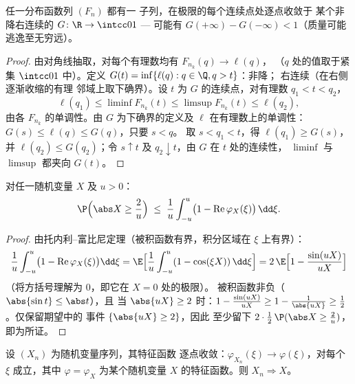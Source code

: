 \begin{theorem}[赫利选择定理]
\label{thm:b3:clt:helly}
任一分布函数列 $(F_n)$ 都有一
子列，在极限的每个连续点处逐点收敛于
某个非降右连续的 $G \colon
\R \to \intcc01$ --- 可能有 $G(+\infty) - G(-\infty) <
1$（质量可能逃逸至无穷远）。
\end{theorem}

\begin{proof}
由对角线抽取，对每个有理数均有 $F_{n_k}(q) \to \ell(q)$，
（$q$ 处的值取于紧集 $\intcc01$ 中）。定义
$G(t) = \inf\{\ell(q) : q \in \Q, q > t\}$：非降；
右连续（在右侧逐渐收缩的有理
邻域上取下确界）。设 $t$ 为
$G$ 的连续点，对有理数 $q_1 < t < q_2$，
\[
\ell(q_1) \leq \liminf F_{n_k}(t) \leq \limsup F_{n_k}(t)
\leq \ell(q_2),
\]
由各 $F_{n_k}$ 的单调性。由
$G$ 为下确界的定义及 $\ell$ 在有理数上的单调性：
$G(s) \leq \ell(q) \leq G(q)$，只要 $s < q$。
取 $s < q_1 < t$，得 $\ell(q_1) \geq G(s)$，并
$\ell(q_2) \leq G(q_2)$；令 $s \uparrow t$ 及 $q_2
\downarrow t$，由 $G$ 在 $t$ 处的连续性，
$\liminf$ 与 $\limsup$ 都夹向 $G(t)$。
\end{proof}

\begin{lemma}[由特征函数得紧性]
\label{lem:b3:clt:tightness}
对任一随机变量 $X$ 及 $u > 0$：
\[
\P\Bigl(\abs X \geq \frac2u\Bigr) \;\leq\;
\frac1u\int_{-u}^{u}\bigl(1 -
\operatorname{Re}\varphi_X(\xi)\bigr)\,\dd\xi .
\]
\end{lemma}

\begin{proof}
由托内利--富比尼定理（被积函数有界，积分区域在
$\xi$ 上有界）：
\[
\frac1u\int_{-u}^u\bigl(1 -
\operatorname{Re}\varphi_X(\xi)\bigr)\dd\xi
= \E\Bigl[\frac1u\int_{-u}^u(1 - \cos(\xi X))\,\dd\xi\Bigr]
= 2\,\E\Bigl[1 - \frac{\sin(uX)}{uX}\Bigr]
\]
（将方括号理解为 $0$，即它在 $X = 0$ 处的极限）。
被积函数非负（$\abs{\sin t} \leq \abs t$），且
当 $\abs{uX} \geq 2$ 时：$1 - \frac{\sin(uX)}{uX} \geq 1 -
\frac1{\abs{uX}} \geq \frac12$。仅保留期望中的
事件 $\{\abs{uX} \geq 2\}$，因此
至少留下 $2 \cdot \frac12\,\P(\abs X \geq \frac2u)$，
即为所证。
\end{proof}

\begin{theorem}[莱维连续性定理]
\label{thm:b3:clt:levy}
设 $(X_n)$ 为随机变量序列，其特征函数
逐点收敛：$\varphi_{X_n}(\xi) \to
\varphi(\xi)$，对每个 $\xi$ 成立，其中 $\varphi =
\varphi_X$ 为某个随机变量
$X$ 的特征函数。则 $X_n \Rightarrow X$。
\end{theorem}

